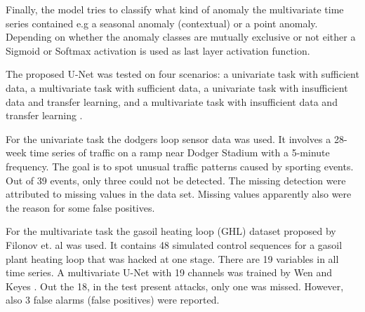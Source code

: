 Finally, the model tries to classify what kind of anomaly the multivariate time series contained e.g a seasonal anomaly (contextual) or a point anomaly. Depending on whether the anomaly classes are mutually exclusive or not either a Sigmoid or Softmax activation is used as last layer activation function.

The proposed U-Net was tested on four scenarios: a univariate task with sufficient data, a multivariate task with sufficient data, a univariate task with insufficient data and transfer learning, and a multivariate task with insufficient data and transfer learning \parencite{Wen2019}. 

For the univariate task the dodgers loop sensor data was used. It involves a 28-week time series of traffic on a ramp near Dodger Stadium with a 5-minute frequency. The goal is to spot unusual traffic patterns caused by sporting events. Out of 39 events, only three could not be detected. The missing detection were attributed to missing values in the data set. Missing values apparently also were the reason for some false positives.

For the multivariate task the gasoil heating loop (GHL) dataset proposed by Filonov et. al \parencite*{Filonov2016} was used. It contains 48 simulated control sequences for a gasoil plant heating loop that was hacked at one stage. There are 19 variables in all time series. A multivariate U-Net with 19 channels was trained by Wen and Keyes \parencite*{Wen2019}. Out the 18, in the test present attacks, only one was missed. However, also 3 false alarms (false positives) were reported. 


